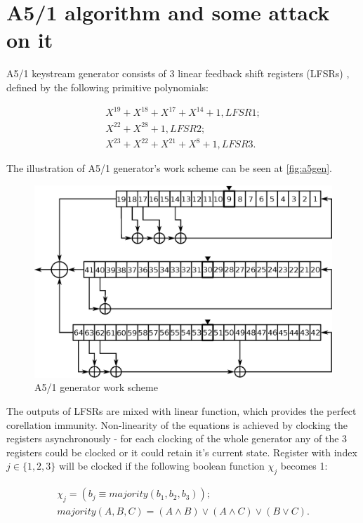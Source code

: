 \documentclass[runningheads,a4paper]{llncs}[2015/06/24]
\begin{document}
\section{A5/1 algorithm and some attack on it}\label{sec:alg}

A5/1 keystream generator consists of 3 linear feedback shift registers (LFSRs)
\cite{MENEZES}, defined by the following primitive polynomials:

\begin{gather*} 
	X^{19}+X^{18}+X^{17}+X^{14}+1, LFSR1;
	\\X^{22}+X^{28}+1, LFSR2;
	\\X^{23}+X^{22}+X^{21}+X^{8}+1, LFSR3.
\end{gather*}

The illustration of A5/1 generator's work scheme can be seen at
\cref{fig:a5gen}.

\begin{figure}
	\includegraphics[width=\linewidth]{./a51.eps} 
	\caption{A5/1 generator work scheme} 
	\label{fig:a51gen} 
\end{figure}

The outputs of LFSRs are mixed with linear function, which provides the perfect
corellation immunity. Non-linearity of the equations is achieved by clocking
the registers asynchronously - for each clocking of the whole generator any of
the 3 registers could be clocked or it could retain it's current state.
Register with index $j \in \{1,2,3\}$ will be clocked if the following boolean
function $\chi_j$ becomes 1:

\begin {gather*}
\chi_j = (b_j \equiv majority(b_1,b_2,b_3)); 
\\majority(A,B,C)=(A \wedge B) \vee (A \wedge C) \vee (B \vee C).
\end{gather*}
\end{document}
